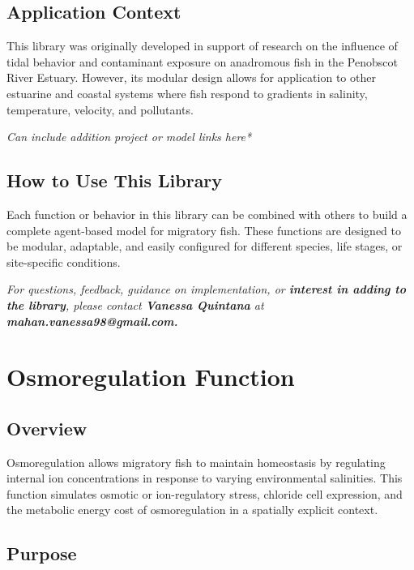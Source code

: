 \documentclass[
]{book}
\begin{document}
\section{Application Context}\label{application-context}

This library was originally developed in support of research on the influence of tidal behavior and contaminant exposure on anadromous fish in the Penobscot River Estuary. However, its modular design allows for application to other estuarine and coastal systems where fish respond to gradients in salinity, temperature, velocity, and pollutants.

\emph{Can include addition project or model links here*}

\section{How to Use This Library}\label{how-to-use-this-library}

Each function or behavior in this library can be combined with others to build a complete agent-based model for migratory fish. These functions are designed to be modular, adaptable, and easily configured for different species, life stages, or site-specific conditions.

\emph{For questions, feedback, guidance on implementation, or \textbf{interest in adding to the library}, please contact \textbf{Vanessa Quintana} at \textbf{mahan.vanessa98@gmail.com.}}

\chapter{Osmoregulation Function}\label{osmoregulation-function}

\section{Overview}\label{overview-1}

Osmoregulation allows migratory fish to maintain homeostasis by regulating internal ion concentrations in response to varying environmental salinities.
This function simulates osmotic or ion-regulatory stress, chloride cell expression, and the metabolic energy cost of osmoregulation in a spatially explicit context.

\section{Purpose}\label{purpose}
\end{document}
